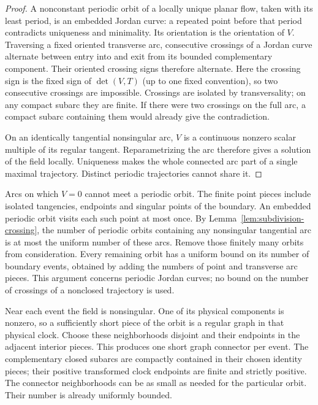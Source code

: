 \begin{proof}
A nonconstant periodic orbit of a locally unique planar flow, taken
with its least period, is an embedded Jordan curve: a repeated point
before that period contradicts uniqueness and minimality.  Its
orientation is the orientation of $V$.  Traversing a fixed oriented
transverse arc, consecutive crossings of a Jordan curve alternate
between entry into and exit from its bounded complementary component.
Their oriented crossing signs therefore alternate.  Here the crossing
sign is the fixed sign of $\det(V,T)$ (up to one fixed convention), so
two consecutive crossings are impossible.  Crossings are isolated by
transversality; on any compact subarc they are finite.  If there were
two crossings on the full arc, a compact subarc containing them would
already give the contradiction.

On an identically tangential nonsingular arc, $V$ is a continuous
nonzero scalar multiple of its regular tangent.  Reparametrizing the
arc therefore gives a solution of the field locally.  Uniqueness makes
the whole connected arc part of a single maximal trajectory.  Distinct
periodic trajectories cannot share it.
\end{proof}

Arcs on which $V=0$ cannot meet a periodic orbit.  The finite point
pieces include isolated tangencies, endpoints and singular points of
the boundary.  An embedded periodic orbit visits each such point at
most once.  By Lemma~\ref{lem:subdivision-crossing}, the number of
periodic orbits containing any nonsingular tangential arc is at most
the uniform number of these arcs.  Remove those finitely many orbits
from consideration.  Every remaining orbit has a uniform bound on its
number of boundary events, obtained by adding the numbers of point and
transverse arc pieces.  This argument concerns periodic Jordan curves;
no bound on the number of crossings of a nonclosed trajectory is used.

Near each event the field is nonsingular.  One of its physical
components is nonzero, so a sufficiently short piece of the orbit is a
regular graph in that physical clock.  Choose these neighborhoods
disjoint and their endpoints in the adjacent interior pieces.  This
produces one short graph connector per event.  The complementary
closed subarcs are compactly contained in their chosen identity pieces;
their positive transformed clock endpoints are finite and strictly
positive.  The connector neighborhoods can be as small as needed for
the particular orbit.  Their number is already uniformly bounded.

